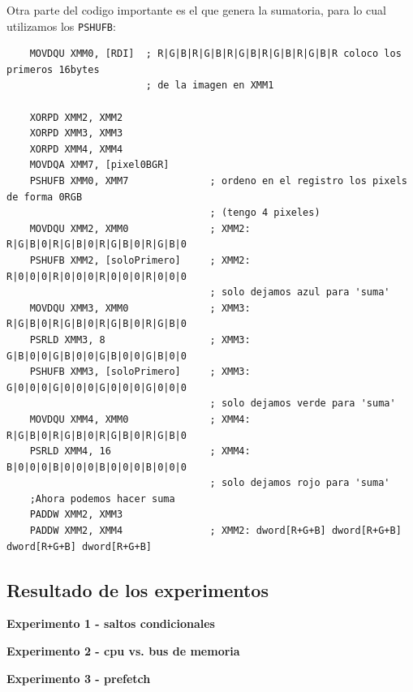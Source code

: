 Otra parte del codigo importante es el que genera la sumatoria, para lo cual utilizamos los \verb|PSHUFB|:\\
\begin{codesnippet}
\begin{verbatim}
	MOVDQU XMM0, [RDI]	; R|G|B|R|G|B|R|G|B|R|G|B|R|G|B|R coloco los primeros 16bytes 
                        ; de la imagen en XMM1

    XORPD XMM2, XMM2
    XORPD XMM3, XMM3
    XORPD XMM4, XMM4
    MOVDQA XMM7, [pixel0BGR]
    PSHUFB XMM0, XMM7              ; ordeno en el registro los pixels de forma 0RGB 
                                   ; (tengo 4 pixeles)
    MOVDQU XMM2, XMM0              ; XMM2: R|G|B|0|R|G|B|0|R|G|B|0|R|G|B|0
    PSHUFB XMM2, [soloPrimero]     ; XMM2: R|0|0|0|R|0|0|0|R|0|0|0|R|0|0|0
                                   ; solo dejamos azul para 'suma'
    MOVDQU XMM3, XMM0              ; XMM3: R|G|B|0|R|G|B|0|R|G|B|0|R|G|B|0 	
    PSRLD XMM3, 8                  ; XMM3: G|B|0|0|G|B|0|0|G|B|0|0|G|B|0|0		
    PSHUFB XMM3, [soloPrimero]     ; XMM3: G|0|0|0|G|0|0|0|G|0|0|0|G|0|0|0
                                   ; solo dejamos verde para 'suma'
    MOVDQU XMM4, XMM0              ; XMM4: R|G|B|0|R|G|B|0|R|G|B|0|R|G|B|0 	
    PSRLD XMM4, 16                 ; XMM4: B|0|0|0|B|0|0|0|B|0|0|0|B|0|0|0
                                   ; solo dejamos rojo para 'suma'
    ;Ahora podemos hacer suma
    PADDW XMM2, XMM3
    PADDW XMM2, XMM4               ; XMM2: dword[R+G+B] dword[R+G+B] dword[R+G+B] dword[R+G+B]
\end{verbatim}
\end{codesnippet}

\subsection{Resultado de los experimentos}
\vspace*{0.3cm} \noindent
\textbf{Experimento 1 - saltos condicionales}

\vspace*{0.3cm} \noindent
\textbf{Experimento 2 - cpu vs. bus de memoria}

\vspace*{0.3cm} \noindent
\textbf{Experimento 3 - prefetch}

